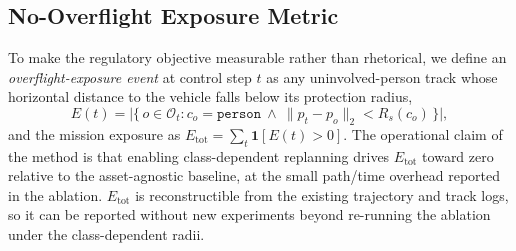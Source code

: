 \subsection{No-Overflight Exposure Metric}
\label{subsec:overflight-metric}
To make the regulatory objective measurable rather than rhetorical, we define an
\emph{overflight-exposure event} at control step $t$ as any uninvolved-person
track whose horizontal distance to the vehicle falls below its protection radius,
\begin{equation}
E(t)=\Big|\{\,o\in\mathcal{O}_t : c_o=\texttt{person}\ \wedge\ \lVert p_t-p_{o}\rVert_2 < R_s(c_o)\,\}\Big|,
\end{equation}
and the mission exposure as $E_{\text{tot}}=\sum_t \mathbf 1[E(t)>0]$. The
operational claim of the method is that enabling class-dependent replanning drives
$E_{\text{tot}}$ toward zero relative to the asset-agnostic baseline, at the small
path/time overhead reported in the ablation. $E_{\text{tot}}$ is reconstructible
from the existing trajectory and track logs, so it can be reported without new
experiments beyond re-running the ablation under the class-dependent radii.
